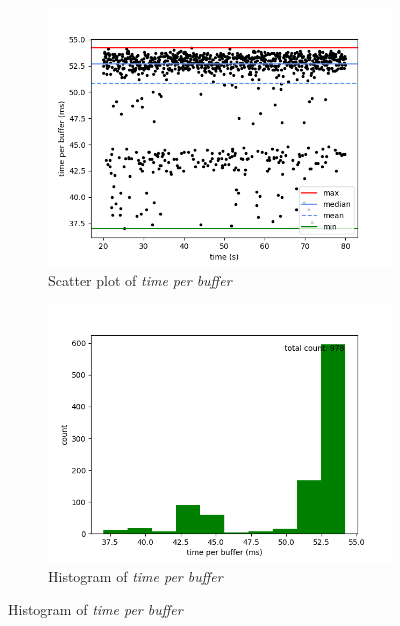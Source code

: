 \begin{figure}[H]
    \centering

    \begin{subfigure}[t]{0.5\textwidth}
        \centering
        \includegraphics[scale=0.45]{img/synthetic_pings_no_wait_per_buffer_scatter.png}
        \caption{Scatter plot of \textit{time per buffer}}
    \end{subfigure}%
    \begin{subfigure}[t]{0.5\textwidth}
        \centering
        \includegraphics[scale=0.45]{img/synthetic_pings_no_wait_per_buffer_hist.png}
        \caption{Histogram of \textit{time per buffer}}
    \end{subfigure}


\end{figure}
